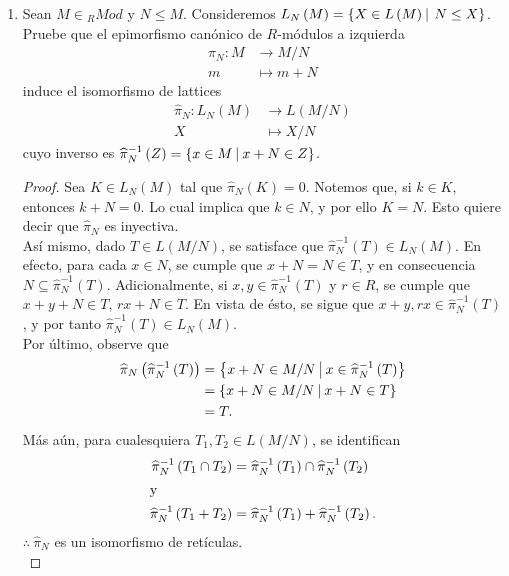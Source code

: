 \documentclass{article}
\newcommand{\lrprth}[1]{
	\left(#1\right)
}
\newcommand{\descset}[3]{
	\left\{#1\in#2\ \vline\ #3\right\}
}
\newcommand{\descapp}[6]{
	#1: #2 &\rightarrow #3\\
	#4 &\mapsto #5#6 
}
\theoremstyle{definition}
\theoremstyle{plain}
\theoremstyle{plain}
\theoremstyle{definition}
\theoremstyle{definition}
\theoremstyle{definition}
\theoremstyle{definition}
\theoremstyle{definition}
\theoremstyle{definition}
\begin{document}
\begin{enumerate}[label=\textbf{Ej \arabic*.}]
\item Sean $M \in {}_{R}Mod$ y $N \leq M$. Consideremos $L_{N}\lrprth{M}=\descset{X}{L\lrprth{M}}{N \leq X}$. Pruebe que el epimorfismo canónico de $R$-módulos a izquierda
\begin{align*}
	\descapp{\pi_{N}}{M}{M/N}{m}{m+N}{ }
\end{align*}
induce el isomorfismo de lattices
\begin{align*}
	\descapp{\widehat{\pi}_{N}}{L_{N}\lrprth{M}}{L\lrprth{M/N}}{X}{X/N}{ }
\end{align*}
cuyo inverso es $\widehat{\pi}_{N}^{-1} \lrprth{Z}=\descset{x}{M}{x+N \in Z}$.
\begin{proof}
	Sea $K \in L_{N}\lrprth{M}$ tal que $\widehat{\pi}_{N} \lrprth{K}=0$. Notemos que, si $k \in K$, entonces $k+N=0$. Lo cual implica que $k \in N$, y por ello $K=N$. Esto quiere decir que $\widehat{\pi}_{N}$ es inyectiva.\\
	
	Así mismo, dado $T \in L\lrprth{M/N}$, se satisface que $\widehat{\pi}_{N}^{-1} \lrprth{T} \in L_{N} \lrprth{M}$. En efecto, para cada $x \in N$, se cumple que $x+N=N \in T$, y en consecuencia $N \subseteq \widehat{\pi}_{N}^{-1} \lrprth{T}$. Adicionalmente, si $x,y \in \widehat{\pi}_{N}^{-1}\lrprth{T}$ y $r \in R$, se cumple que $x+y+N \in T$, $rx+N \in T$. En vista de ésto, se sigue que $x+y, rx \in \widehat{\pi}_{N}^{-1} \lrprth{T}$, y por tanto $\widehat{\pi}_{N}^{-1} \lrprth{T} \in L_{N} \lrprth{M}$.\\
	
	Por último, observe que
	\begin{align*}
		\widehat{\pi}_{N} \lrprth{ \widehat{\pi}_{N}^{-1} \lrprth{T}}&=\descset{x+N}{M/N}{x \in \widehat{\pi}_{N}^{-1} \lrprth{T}}\\
		&=\descset{x+N}{M/N}{x+N \in T}\\
		&=T.
	\end{align*}
	Más aún, para cualesquiera $T_{1},T_{2} \in L\lrprth{M/N}$, se identifican
	\begin{align*}
		\widehat{\pi}_{N}^{-1} \lrprth{T_{1} \cap T_{2}} &= \widehat{\pi}_{N}^{-1} \lrprth{T_{1}} \cap \widehat{\pi}_{N}^{-1} \lrprth{T_{2}}\\
		\intertext{y}
		\widehat{\pi}_{N}^{-1} \lrprth{T_{1}+T_{2}} &= \widehat{\pi}_{N}^{-1} \lrprth{T_{1}} + \widehat{\pi}_{N}^{-1} \lrprth{T_{2}}.
	\end{align*}
	$\therefore\ \widehat{\pi}_{N}$ es un isomorfismo de retículas.\\
\end{proof}


\end{enumerate}
\end{document}

